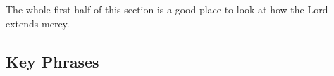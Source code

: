 		
		\begin{compactdesc}
			\item[{\hyperref[DC97-2]{DC 97:2}}]
				\begin{compactitem}
					\item The whole first half of this section is a good place to look at how the Lord extends mercy.
				\end{compactitem}
		\end{compactdesc}
		
	
		
		
\subsection{Key Phrases} %
	\label{MERCY-PHRASES}

